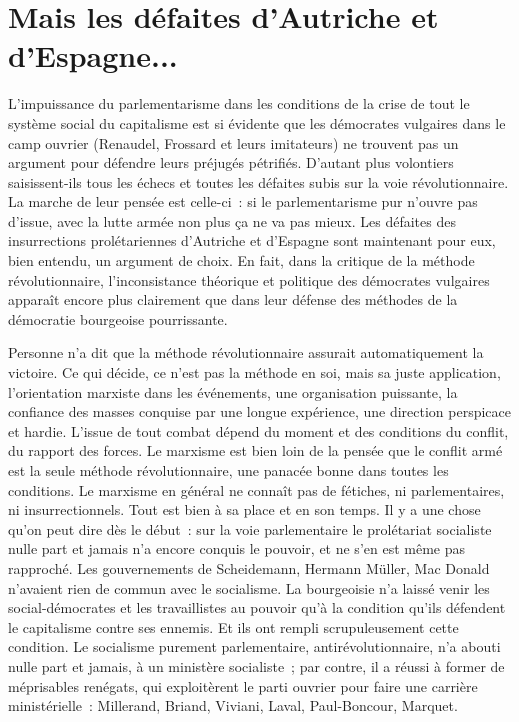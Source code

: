 \documentclass[french,twoside]{book} %
\begin{document}
\section[{Mais les défaites d’Autriche et d’Espagne...}]{Mais les défaites d’Autriche et d’Espagne...}
\noindent L’impuissance du parlementarisme dans les conditions de la crise de tout le système social du capitalisme est si évidente que les démocrates vulgaires dans le camp ouvrier (Renaudel, Frossard et leurs imitateurs) ne trouvent  pas un argument pour défendre leurs préjugés pétrifiés. D’autant plus volontiers saisissent-ils tous les échecs et toutes les défaites subis sur la voie révolutionnaire. La marche de leur pensée est celle-ci : si le parlementarisme pur n’ouvre pas d’issue, avec la lutte armée non plus ça ne va pas mieux. Les défaites des insurrections prolétariennes d’Autriche et d’Espagne sont maintenant pour eux, bien entendu, un argument de choix. En fait, dans la critique de la méthode révolutionnaire, l’inconsistance théorique et politique des démocrates vulgaires apparaît encore plus clairement que dans leur défense des méthodes de la démocratie bourgeoise pourrissante.\par
Personne n’a dit que la méthode révolutionnaire assurait automatiquement la victoire. Ce qui décide, ce n’est pas la méthode en soi, mais sa juste application, l’orientation marxiste dans les événements, une organisation puissante, la confiance des masses conquise par une longue expérience, une direction perspicace et hardie. L’issue de tout combat dépend du moment et des conditions du conflit, du rapport des forces. Le marxisme est bien loin de la pensée que le conflit armé est la seule méthode révolutionnaire, une panacée bonne dans toutes les conditions. Le marxisme en général ne connaît pas de fétiches, ni parlementaires, ni insurrectionnels. Tout est bien à sa place et en son temps. Il y a une chose qu’on peut dire dès le début : sur la voie parlementaire le prolétariat socialiste nulle part et jamais n’a encore conquis le pouvoir, et ne s’en est même pas rapproché. Les gouvernements de Scheidemann, Hermann Müller, Mac Donald n’avaient rien de commun avec le socialisme. La bourgeoisie n’a laissé venir les social-démocrates et les travaillistes au pouvoir qu’à la condition qu’ils défendent le capitalisme contre ses ennemis. Et ils ont rempli scrupuleusement cette condition. Le socialisme purement parlementaire, antirévolutionnaire, n’a abouti nulle part et  jamais, à un ministère socialiste ; par contre, il a réussi à former de méprisables renégats, qui exploitèrent le parti ouvrier pour faire une carrière ministérielle : Millerand, Briand, Viviani, Laval, Paul-Boncour, Marquet.\par
\end{document}
